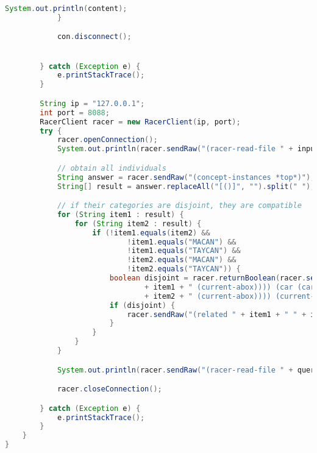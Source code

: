 \documentclass[a4paper,12pt]{report}
\begin{document}
\begin{lstlisting}[language=Java]
                System.out.println(content);
            }

            con.disconnect();


        } catch (Exception e) {
            e.printStackTrace();
        }

        String ip = "127.0.0.1";
        int port = 8088;
        RacerClient racer = new RacerClient(ip, port);
        try {
            racer.openConnection();
            System.out.println(racer.sendRaw("(racer-read-file " + input + ")"));

            // obtain all individuals
            String answer = racer.sendRaw("(concept-instances *top*)");
            String[] result = answer.replaceAll("[()]", "").split(" ");

            // if their categories are disjoint, they are compatible
            for (String item1 : result) {
                for (String item2 : result) {
                    if (!item1.equals(item2) &&
                            !item1.equals("MACAN") &&
                            !item1.equals("TAYCAN") &&
                            !item2.equals("MACAN") &&
                            !item2.equals("TAYCAN")) {
                        boolean disjoint = racer.returnBoolean(racer.sendRaw("(evaluate (concept-disjoint-p (car (car (most-specific-instantiators '"
                                + item1 + " (current-abox)))) (car (car (most-specific-instantiators '"
                                + item2 + " (current-abox)))) (current-tbox)))"));
                        if (disjoint) {
                            racer.sendRaw("(related " + item1 + " " + item2 + " ISCOMPATIBLEITEMITEM)");
                        }
                    }
                }
            }

            System.out.println(racer.sendRaw("(racer-read-file " + queries + ")"));

            racer.closeConnection();

        } catch (Exception e) {
            e.printStackTrace();
        }
    }
}


\end{lstlisting}
\end{document}
